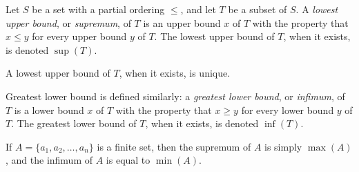 \documentclass[12pt]{article}
\begin{document}
Let $S$ be a set with a partial ordering $\leq$, and let $T$ be a subset of $S$. A \emph{lowest upper bound}, or \emph{supremum}, of $T$ is an upper bound $x$ of $T$ with the property that $x \leq y$ for every upper bound $y$ of $T$. The lowest upper bound of $T$, when it exists, is denoted $\operatorname{sup}(T)$.

A lowest upper bound of $T$, when it exists, is unique.

Greatest lower bound is defined similarly: a \emph{greatest lower bound}, or \emph{infimum}, of $T$ is a lower bound $x$ of $T$ with the property that $x \geq y$ for every lower bound $y$ of $T$. The greatest lower bound of $T$, when it exists, is denoted $\operatorname{inf}(T)$.

If $A = \{a_1,a_2,\ldots,a_n\}$ is a finite set, then the supremum of $A$ is simply $\max(A)$, and the infimum of $A$ is equal to $\min(A)$.
\end{document}
